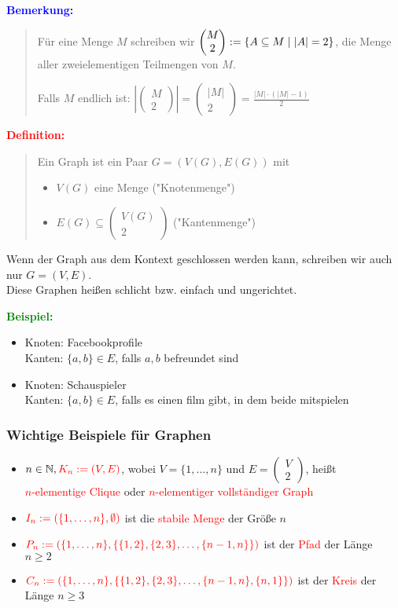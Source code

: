 \documentclass{article}
\newcommand{\smsp}{\phantom{\hspace{3px}}}
\newcommand{\red}[1]{\textcolor{red}{#1}}
\newcommand{\blue}[1]{\textcolor{blue}{#1}}
\newcommand{\green}[1]{\textcolor{green}{#1}}
\newcommand{\ex}{\green{\textbf{Beispiel: }}}
\newcommand{\de}[1]{\red{\textbf{Definition: }}\begin{quote}#1\end{quote}}
\newcommand{\an}[1]{\blue{\textbf{Bemerkung: }}\begin{quote}#1\end{quote}}
\newcommand{\N}{\mathbb{N}}
\renewcommand{\st}{\smsp | \smsp}
\newcommand{\vvec}[2]{\begin{pmatrix}#1\\#2\end{pmatrix}}
\begin{document}
\an{
    Für eine Menge $M$ schreiben wir $\vvec{M}{2} := \{A \subseteq M \st |A| = 2\}$, die Menge aller zweielementigen Teilmengen von $M$.

    Falls $M$ endlich ist: $|\vvec{M}{2}| = \vvec{|M|}{2} = \frac{|M| \cdot (|M| - 1)}{2}$
}

\de{
    Ein Graph ist ein Paar $G=(V(G), E(G))$ mit
    \begin{itemize}
        \item $V(G)$ eine Menge ("Knotenmenge")
        \item $E(G) \subseteq \vvec{V(G)}{2}$ ("Kantenmenge")
    \end{itemize}
}

Wenn der Graph aus dem Kontext geschlossen werden kann, schreiben wir auch nur $G = (V,E)$.\\
Diese Graphen heißen schlicht bzw. einfach und ungerichtet.

\ex \begin{itemize}
    \item Knoten: Facebookprofile\\
    Kanten: $\{a,b\} \in E$, falls $a,b$ befreundet sind
    \item Knoten: Schauspieler\\
    Kanten: $\{a,b\} \in E$, falls es einen film gibt, in dem beide mitspielen
\end{itemize}

{}
\subsubsection{Wichtige Beispiele für Graphen}

\begin{itemize}
    \item $n \in \N, \red{K_n := (V,E)}$, wobei $V = \{1, \dots, n\}$ und $E = \vvec{V}{2}$, heißt\\
    \red{$n$-elementige Clique} oder \red{$n$-elementiger vollständiger Graph}
    \item $\red{I_n := (\{1, \dots, n\}, \emptyset)}$ ist die \red{stabile Menge} der Größe $n$
    \item $\red{P_n := (\{1, \dots, n\}, \{\{1,2\}, \{2,3\}, \dots, \{n-1,n\}\})}$ ist der \red{Pfad} der Länge $n \ge 2$
    \item $\red{C_n := (\{1, \dots, n\}, \{\{1,2\}, \{2,3\}, \dots, \{n-1,n\}, \{n,1\}\})}$ ist der \red{Kreis} der Länge $n \ge 3$
\end{itemize}
\end{document}
